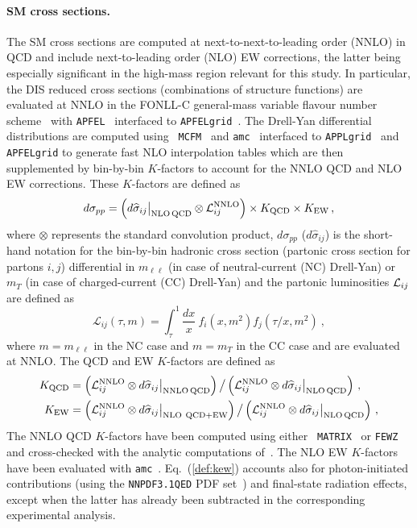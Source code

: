 \documentclass[withindex,glossary]{cam-thesis}
\begin{document}
\paragraph{SM cross sections.}
%
The SM cross sections are computed at next-to-next-to-leading order
(NNLO) in QCD and include next-to-leading order (NLO) EW corrections,
the latter being especially significant in the high-mass region relevant for this study.
In particular, the DIS reduced cross sections (combinations of structure functions)
are evaluated at NNLO in the FONLL-C general-mass 
variable flavour number scheme~\cite{Forte_2010} with {\tt APFEL}~\cite{Bertone_2014}
interfaced to {\tt APFELgrid}~\cite{Bertone:2016lga}.
The Drell-Yan differential distributions are computed using {\tt
MCFM}~\cite{Campbell:2019dru} and \texttt{amc}~\cite{Frederix:2018nkq} interfaced to
{\tt APPLgrid}~\cite{Carli:2010rw} and {\tt APFELgrid} to generate fast NLO
interpolation tables which are then supplemented by bin-by-bin $K$-factors to
account for the NNLO QCD and NLO EW corrections.
These $K$-factors are defined as
\begin{equation}
\label{eq:kfactors_dy_paper}
 d\sigma_{pp}= \left(d\widehat\sigma_{ij}\big|_{\rm NLO\, QCD}\otimes {\cal L}^{\rm NNLO}_{ij}\right)\times K_{\rm QCD} \times   K_{\rm EW} \, ,
\end{equation}
where $\otimes$ represents the standard convolution product, $d\sigma_{pp}$ ($d\widehat\sigma_{ij}$) is the short-hand
notation for the bin-by-bin hadronic cross section (partonic cross
section for partons $i,j$) differential in $m_{\ell\ell}$ (in case of neutral-current (NC)
Drell-Yan) or $m_T$ (in case of charged-current (CC) Drell-Yan) and the partonic luminosities ${\cal L}_{ ij}$ are
defined as
\begin{equation}
\mathcal{L}_{ij}(\tau,m) = \int_{\tau}^1 \frac{d x}{x}~f_i (x,m^2) f_j (\tau/x,m^2) ~,
\end{equation}
where $m=m_{\ell\ell}$ in the NC case and $m=m_T$ in the CC case and
are evaluated at NNLO. The QCD and EW $K$-factors are defined as
\begin{align}
  K_{\rm QCD}&= \left( {\cal L}_{
             ij}^{\rm NNLO} \otimes d\widehat\sigma_{ij}\big|_{\rm NNLO\, QCD}\right)
             \big/\left({\cal L}_{
             ij}^{\rm NNLO} \otimes d\widehat\sigma_{ij}\big|_{\rm NLO\, QCD}\right) \, , \label{def:kqcd}\\
K_{\rm EW}&= \left({\cal L}_{ ij}^{\rm NNLO}\otimes
            d\widehat\sigma_{ij}\big|_{\rm NLO~QCD+EW}\right)
            \big/ \left({\cal L}_{ ij}^{\rm NNLO} \otimes d\widehat\sigma_{ij}\big|_{\rm NLO\, QCD} \right) \, , \label{def:kew}
\end{align}
%
The NNLO QCD $K$-factors have been computed using either {\tt
  MATRIX}~\cite{Grazzini_2018} or {\tt FEWZ}~\cite{Li:2012wna}
and cross-checked with the analytic computations of~\cite{Duhr:2020seh,Duhr:2020sdp}.
%
The NLO EW $K$-factors have been evaluated with \texttt{amc}~\cite{Frederix:2018nkq}.
%
Eq.~(\ref{def:kew}) accounts also for photon-initiated contributions
(using the {\tt NNPDF3.1QED} PDF set~\cite{Bertone:2017bme})
and final-state radiation effects, except when the latter
has already been subtracted in the corresponding experimental analysis.
\end{document}
